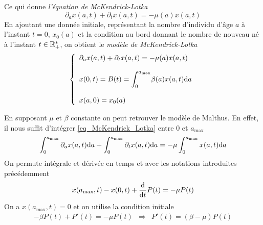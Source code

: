 Ce qui donne \textcolor{astral}{\textit{l'équation de McKendrick-Lotka}}
\begin{equation}\label{eq_McKendrick_Lotka}
    \partial_a x(a,t) + \partial_tx(a,t) = -\mu(a)x(a,t)
\end{equation}
En ajoutant une donnée initiale, représentant la nombre d'individu d'âge $a$ à l'instant $t=0$, $x_0(a)$ et la condition au bord donnant le nombre de nouveau né à l'instant $t \in \mathbb{R}_+^*$, on obtient le \textcolor{astral}{\textit{modèle de McKendrick-Lotka}}
\begin{equation}\label{modele_McKendrick_Lotka}
    \left\{\begin{array}{l}
        \partial_a x(a,t) + \partial_t x(a,t) = -\mu(a)x(a,t) \\
        \\
        x(0,t) = B(t) = \displaystyle{\int_0^{a_{\max}}} \beta (a)x(a,t)\mathrm{d} a \\
        \\
        x(a,0) = x_0(a)
    \end{array}\right.
\end{equation}

\begin{remark}
    En supposant $\mu$ et $\beta$ constante on peut retrouver le modèle de Malthus. En effet, il nous suffit d'intégrer \eqref{eq_McKendrick_Lotka} entre $0$ et $a_{\max}$
    \begin{equation*}
        \int_0^{a_{\max}} \partial_a x(a,t)\mathrm{d} a + \int_0^{a_{\max}} \partial_t x(a,t)\mathrm{d} a = - \mu \int_0^{a_{\max}} x(a,t)\mathrm{d} a
    \end{equation*}
    On permute intégrale et dérivée en temps et avec les notations introduites précédemment
    \begin{equation*}
        x(a_{\max},t)-x(0,t) + \frac{\mathrm{d}}{\mathrm{d} t} P(t) = -\mu P(t)
    \end{equation*}
    On a $x(a_{\max},t)=0$ et on utilise la condition initiale 
    \begin{eqnarray*}
        -\beta P(t) + P'(t) = -\mu P(t) &\Longrightarrow& 
        P'(t) = (\beta - \mu)P(t)
    \end{eqnarray*}
\end{remark}

